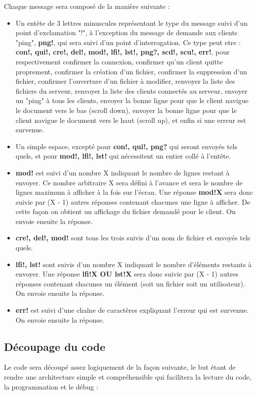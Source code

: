\documentclass[12pt]{article}
\begin{document}
Chaque message sera composé de la manière suivante :
\begin{itemize}
\item Un entête de 3 lettres minuscules représentant le type du message suivi d'un point d'exclamation "!", à l'exception du message de demande aux clients "ping", \textbf{png!}, qui sera suivi d'un point d'interrogation. Ce type peut etre : \textbf{con!, qui!, cre!, del!, mod!, lfi!, lst!, png?, scd!, scu!, err!}, pour respectivement confirmer la connexion, confirmer qu'un client quitte proprement, confirmer la création d'un fichier, confirmer la suppression d'un fichier, confirmer l'ouverture d'un fichier à modifier, renvoyer la liste des fichiers du serveur, renvoyer la liste des clients connectés au serveur, envoyer un "ping" à tous les clients, envoyer la bonne ligne pour que le client navigue le document vers le bas (scroll down), envoyer la bonne ligne pour que le client navigue le document vers le haut (scroll up), et enfin si une erreur est survenue.
\item Un simple espace, excepté pour \textbf{con!, qui!, png?} qui seront envoyés tels quels, et pour \textbf{mod!, lfi!, lst!} qui nécessitent un entier collé à l'entête.
\item \textbf{mod!} est suivi d'un nombre X indiquant le nombre de lignes restant à envoyer. Ce nombre arbitraire X sera défini à l'avance et sera le nombre de lignes maximum à afficher à la fois sur l'écran. Une réponse \textbf{mod!X} sera donc suivie par (X - 1) autres réponses contenant chacunes une ligne à afficher. De cette façon on obtient un affichage du fichier demandé pour le client. On envoie ensuite la réponse.
\item \textbf{cre!, del!, mod!} sont tous les trois suivis d'un nom de fichier et envoyés tels quels.
\item \textbf{lfi!, lst!} sont suivis d'un nombre X indiquant le nombre d'éléments restants à envoyer. Une réponse \textbf{lfi!X OU lst!X} sera donc suivie par (X - 1) autres réponses contenant chacunes un élément (soit un fichier soit un utilisateur). On envoie ensuite la réponse.
\item \textbf{err!} est suivi d'une chaîne de caractères expliquant l'erreur qui est survenue. On envoie ensuite la réponse.
\end{itemize}


\subsection{Découpage du code}
Le code sera découpé assez logiquement de la façon suivante, le but étant de rendre une architecture simple et compréhensible qui facilitera la lecture du code, la programmation et le débug :\\
\end{document}
